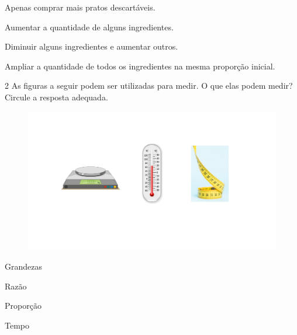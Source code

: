 
\begin{escolha}
\item
  Apenas comprar mais pratos descartáveis.
\item
  Aumentar a quantidade de alguns ingredientes.
\item
  Diminuir alguns ingredientes e aumentar outros.
\item
  Ampliar a quantidade de todos os ingredientes na mesma proporção inicial.
\end{escolha}


\num{2} As figuras a seguir podem ser utilizadas para medir. O que elas podem medir? Circule a resposta adequada.

\begin{figure}[htpb!]
\includegraphics[width=\textwidth]{../ilustracoes/MAT5/SAEB_5ANO_MAT_figura78.png}
\end{figure}

\begin{escolha}
\item
  Grandezas
\item
  Razão
\item
  Proporção
\item
  Tempo
\end{escolha}

